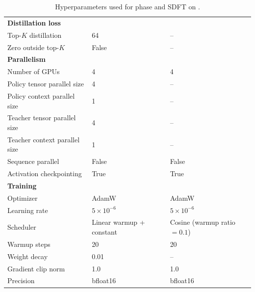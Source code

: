 \begin{table}[h!]
\begin{tabular}{p{3.5cm}p{4cm}p{4cm}}
\midrule
\textbf{Distillation loss} & & \\
Top-$K$ distillation & 64 & -- \\
Zero outside top-$K$ & False & -- \\

\midrule
\textbf{Parallelism} & & \\
Number of GPUs & 4 & 4 \\
Policy tensor parallel size & 4 & -- \\
Policy context parallel size & 1 & -- \\
Teacher tensor parallel size & 4 & -- \\
Teacher context parallel size & 1 & -- \\
Sequence parallel & False & False \\
Activation checkpointing & True & True \\

\midrule
\textbf{Training} & & \\
Optimizer & AdamW & AdamW \\
Learning rate & $5 \times 10^{-6}$ & $5 \times 10^{-6}$ \\
Scheduler & Linear warmup + constant & Cosine (warmup ratio $=0.1$) \\
Warmup steps & 20 & 20 \\
Weight decay & 0.01 & -- \\
Gradient clip norm & 1.0 & 1.0 \\
Precision & bfloat16 & bfloat16 \\

\bottomrule
\end{tabular}
\caption{Hyperparameters used for \ours{} \opsd{} phase and SDFT on \qwen{}.}
\label{tab:distillation_hparams}
\end{table}